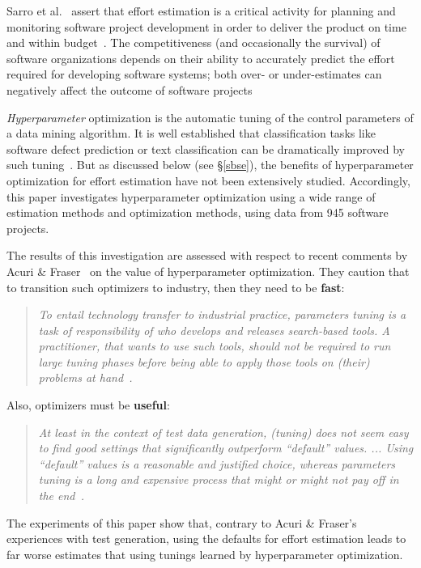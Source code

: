 \documentclass[10pt,conference]{IEEEtran}
\begin{document}
Sarro et al.~\cite{sarro2016multi} assert that effort  estimation  is  a  critical  activity  for  planning  and
monitoring software project development in order to deliver
the  product  on  time  and  within  budget~\cite{briand2002resource,kocaguneli2011experiences,trendowicz2014software}.   The
competitiveness (and occasionally the survival) of software
organizations depends on their ability to accurately predict
the  effort  required  for  developing  software  systems;  both
over- or under-estimates can negatively affect the outcome
of software projects~\cite{mcconnell2006software,mendes2002further,sommerville2010software,trendowicz2014software}



{\em Hyperparameter} optimization  is the automatic tuning
of the control parameters of a data
mining algorithm.
It is well established that  classification tasks like software defect prediction or 
 text classification can be dramatically improved by such tuning~\cite{Fu2016TuningFS,tanti18,thornton2013auto,AGRAWAL2018,agrawal2017better}.
But as discussed below (see  \S\ref{sbse}), the  benefits of     hyperparameter optimization for   effort estimation 
have not been extensively
studied.  Accordingly, this paper investigates hyperparameter optimization using a wide
range of estimation methods and optimization methods, using data from 945 software projects.
 


The results of this investigation are assessed   with respect to recent comments by 
Acuri \& Fraser~\cite{Arcuri2013} on the    value  of hyperparameter optimization.
They caution that to transition such optimizers  to industry, then they need to be {\bf  fast}:
\begin{quote}
{\em To entail technology transfer to industrial practice, {\em parameters} tuning is a task of responsibility of who develops and releases search-based tools.
A practitioner, that wants to use such tools, should not be required to run large tuning phases before being able to apply those tools on (their) problems at hand~\cite{Arcuri2013}.}
\end{quote}
Also,  optimizers must  be {\bf useful}:
\begin{quote}
{\em At least in the context of test data generation, (tuning) does not seem easy to find good settings that significantly outperform   ``default'' {\em values}. ... Using ``default'' {\em values} is a reasonable and justified choice, whereas {\em parameters} tuning is a long and expensive process that might or might not pay off in the end~\cite{Arcuri2013}.}
\end{quote}
The experiments of this paper show that,  contrary to Acuri \& Fraser's experiences with test generation,
using the defaults for effort estimation leads to far worse estimates that using
tunings learned by
hyperparameter optimization.
\end{document}
